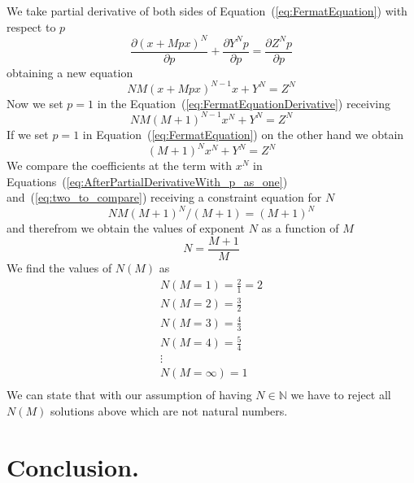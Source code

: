\documentclass{article}
\begin{document}
We take partial derivative of both sides of Equation~(\ref{eq:FermatEquation}) with respect to $p$ 
\begin{equation}
\label{eq:FermatEquationTakingDerivative}
\frac{\partial (x + Mpx)^N}{\partial p} + \frac{\partial Y^N p}{\partial p} = \frac{\partial Z^N p}{\partial p}
\end{equation}
obtaining a new equation
\begin{equation}
\label{eq:FermatEquationDerivative}
N M (x + Mpx)^{N-1} x + Y^N  = Z^N
\end{equation}
Now we set $p=1$ in the Equation~(\ref{eq:FermatEquationDerivative}) receiving
\begin{equation}
\label{eq:AfterPartialDerivativeWith_p_as_one}
N M (M+1)^{N-1} x^N + Y^N  = Z^N
\end{equation}
If we set $p=1$ in Equation~(\ref{eq:FermatEquation}) on the other hand we obtain
\begin{equation}
\label{eq:two_to_compare}
(M+1)^{N} x^{N} + Y^N  = Z^N
\end{equation}
We compare the coefficients at the term with $x^{N}$ in Equations~(\ref{eq:AfterPartialDerivativeWith_p_as_one}) 
and~(\ref{eq:two_to_compare})
receiving a constraint equation for $N$
\begin{equation}
\label{eq:constraint_for_N}
NM(M+1)^{N}/(M+1) = (M+1)^{N}
\end{equation}
and therefrom we obtain the values of exponent $N$ as a function of $M$
\begin{equation}
\label{eq:constraintNM}
N = \frac{M+1}{M}
\end{equation}
We find the values of $N(M)$ as
\begin{eqnarray}
\label{eq:constraint}
N(M=1) = \frac{2}{1} = 2    \\ \nonumber
N(M=2) = \frac{3}{2}        \\ \nonumber
N(M=3) = \frac{4}{3}        \\ \nonumber
N(M=4) = \frac{5}{4}        \\ \nonumber
\vdots                      \\ \nonumber
N(M=\infty) = 1             \\ \nonumber
\end{eqnarray}
We can state that with our assumption of having $N \in \mathbb{N}$ we have to reject
all $N(M)$ solutions above which are not natural numbers.

\section{Conclusion.}
\end{document}
